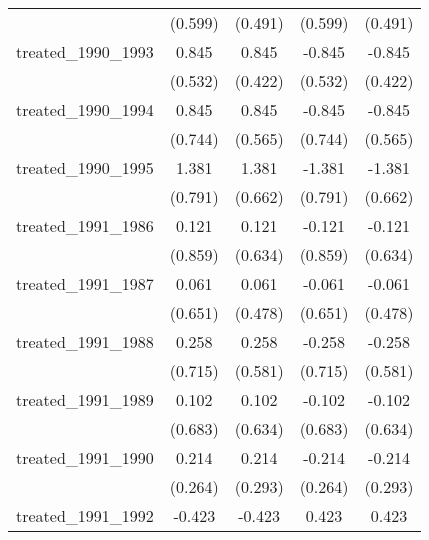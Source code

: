 {\begin{tabular}{l*{4}{c}}
            &     (0.599)         &     (0.491)         &     (0.599)         &     (0.491)         \\
[1em]
treated\_1990\_1993&       0.845         &       0.845\sym{*}  &      -0.845         &      -0.845\sym{*}  \\
            &     (0.532)         &     (0.422)         &     (0.532)         &     (0.422)         \\
[1em]
treated\_1990\_1994&       0.845         &       0.845         &      -0.845         &      -0.845         \\
            &     (0.744)         &     (0.565)         &     (0.744)         &     (0.565)         \\
[1em]
treated\_1990\_1995&       1.381         &       1.381\sym{*}  &      -1.381         &      -1.381\sym{*}  \\
            &     (0.791)         &     (0.662)         &     (0.791)         &     (0.662)         \\
[1em]
treated\_1991\_1986&       0.121         &       0.121         &      -0.121         &      -0.121         \\
            &     (0.859)         &     (0.634)         &     (0.859)         &     (0.634)         \\
[1em]
treated\_1991\_1987&       0.061         &       0.061         &      -0.061         &      -0.061         \\
            &     (0.651)         &     (0.478)         &     (0.651)         &     (0.478)         \\
[1em]
treated\_1991\_1988&       0.258         &       0.258         &      -0.258         &      -0.258         \\
            &     (0.715)         &     (0.581)         &     (0.715)         &     (0.581)         \\
[1em]
treated\_1991\_1989&       0.102         &       0.102         &      -0.102         &      -0.102         \\
            &     (0.683)         &     (0.634)         &     (0.683)         &     (0.634)         \\
[1em]
treated\_1991\_1990&       0.214         &       0.214         &      -0.214         &      -0.214         \\
            &     (0.264)         &     (0.293)         &     (0.264)         &     (0.293)         \\
[1em]
treated\_1991\_1992&      -0.423         &      -0.423         &       0.423         &       0.423         \\

\end{tabular}}

